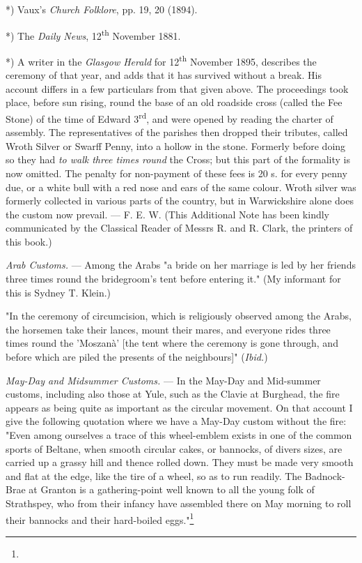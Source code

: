 \documentclass[a4paper, 11pt, oneside, polutonikogreek, english]{article}
\begin{document}
*) Vaux's \emph{Church Folklore}, pp. 19, 20 (1894).

*) The \emph{Daily News}, 12\textsuperscript{th} November 1881.

*) A writer in the \emph{Glasgow Herald} for 12\textsuperscript{th} November 1895, describes the ceremony of that year, and adds that it has survived without a break. His account differs in a few particulars from that given above. The proceedings took place, before sun rising, round the base of an old roadside cross (called the Fee Stone) of the time of Edward 3\textsuperscript{rd}, and were opened by reading the charter of assembly. The representatives of the parishes then dropped their tributes, called Wroth Silver or Swarff Penny, into a hollow in  the stone. Formerly before doing so they had \emph{to walk three times round} the  Cross; but this part of the formality is now omitted. The penalty for non-payment of these fees is 20 s. for every penny due, or a white bull with a red nose and ears of the same colour. Wroth silver was formerly collected in various parts of the country, but in Warwickshire alone does the custom now prevail. --- F. E. W. (This Additional Note has been kindly communicated by the Classical Reader of Messrs R. and R. Clark, the printers of this book.)

\emph{Arab Customs.} --- Among the Arabs "a bride on her marriage is led by her friends three times round the bridegroom's tent before entering it." (My informant for this is Sydney T. Klein.)

"In the ceremony of circumcision, which is religiously observed among the Arabs, the horsemen take their lances, mount their mares, and everyone rides three times round the 'Moszanà' [the tent where the ceremony is gone through, and before which are piled the presents of the neighbours]" (\emph{Ibid.})

\emph{May-Day and Midsummer Customs.} --- In the May-Day and Mid-summer customs, including also those at Yule, such as the Clavie at Burghead, the fire appears as being quite as important as the circular movement. On that account I give the following quotation where we have a May-Day custom without the fire: "Even among ourselves a trace of this wheel-emblem exists in one of the common sports of Beltane, when smooth circular cakes, or bannocks, of divers sizes, are carried up a grassy hill and thence rolled down. They must be made very smooth and flat at the edge, like the tire of a wheel, so as to run readily. The Badnock-Brae at Granton is a gathering-point well known to all the young folk of Strathspey, who from their infancy have assembled there on May morning to roll their bannocks and their hard-boiled eggs."\footnote{}
\end{document}
